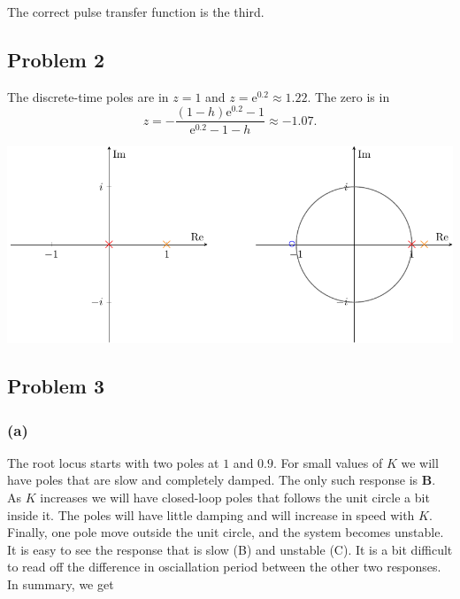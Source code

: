 \documentclass[a4paper,12pt]{article}
\newcommand*{\mexp}[1]{\ensuremath{\mathrm{e}^{#1}}}
\begin{document}
   The correct pulse transfer function is the third.

\subsection*{Problem 2}
The discrete-time poles are in $z=1$ and $z=\mexp{0.2} \approx 1.22$. The zero is  in 
\[ z = - \frac{(1-h)\mexp{0.2} - 1}{\mexp{0.2} - 1 -h} \approx -1.07. \]
\begin{center}
\includegraphics[width=0.8\linewidth]{complex-plane-facit}
\end{center}
 
\subsection*{Problem 3}

\subsubsection*{(a)}

The root locus starts with two poles at $1$ and $0.9$. For small values of $K$ we will have poles that are slow and completely damped. The only such response is \textbf{B}. As $K$ increases we will have closed-loop poles that follows the unit circle a bit inside it. The poles will have little damping and will increase in speed with $K$. Finally, one pole move outside the unit circle, and the system becomes unstable. It is easy to see the response that is slow (B) and unstable (C). It is a bit difficult to read off the difference in osciallation period between the other two responses. In summary, we get
\end{document}

